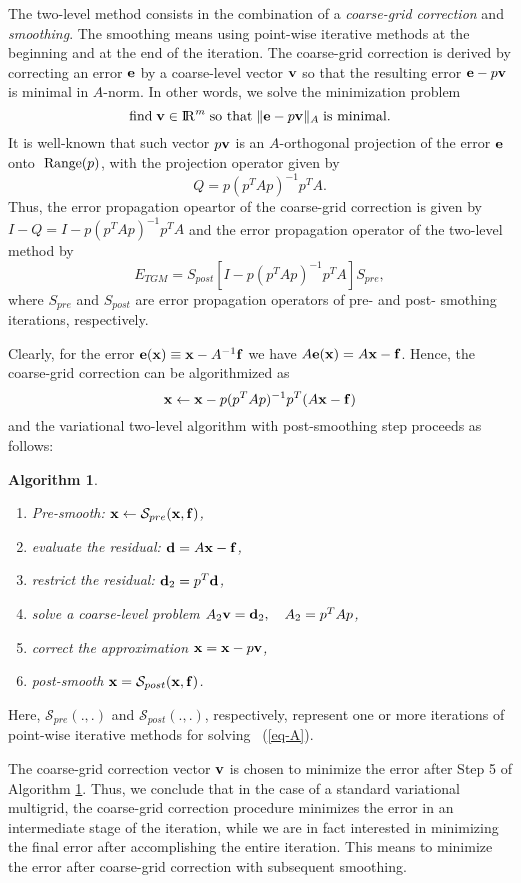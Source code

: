 \documentclass[twoside, 12pt]{article}
\renewcommand{\Re}{{\rm I\negthinspace R}}
\newcommand{\vc}[1]{{\bf #1}} 			%
\newcommand{\eq}[1]{\begin{equation}\label{eq-#1}}
\newcommand{\qe}{\end{equation}}
\newcommand{\range}{{\;\mathop {\rm Range}\nolimits}}
\newcommand{\eqr}[1]{~(\ref{eq-#1})}        %
\newtheorem{algorithm}{Algorithm}
\begin{document}
The two-level method consists in the combination of
a {\em coarse-grid correction} and
{\em smoothing}. The smoothing means using point-wise iterative methods 
at the beginning and at the end of the iteration.
The coarse-grid correction is derived by correcting an error
$\vc{e}$ by a coarse-level vector $\vc{v}$ so that the resulting error
$\vc{e}-p\vc{v}$ is minimal in $A$-norm. In other words, we solve
the minimization problem
\eq{standard}
  \mbox{find} \; \vc{v} \in \Re^m \; \mbox{so that} \;
  \| \vc{e}-p\vc{v}\|_A \; \mbox{is minimal}.
\qe
It is well-known that such vector $p\vc{v}$ is an $A$-orthogonal projection
of the error $\vc{e}$ onto $\range(p)$, with the projection
operator given by
$$
      Q = p(p^TAp)^{-1}p^TA.
$$
Thus, the error propagation opeartor of the coarse-grid correction is given by
$I-Q=I-p(p^TAp)^{-1}p^TA$ and the error propagation operator of the two-level
method by
\eq{E}
      E_{TGM}=S_{post}[I-p(p^TAp)^{-1}p^TA]S_{pre},
\qe
where $S_{pre}$ and $S_{post}$ are error propagation operators of
pre- and post- smothing iterations, respectively.

Clearly, for the error $\vc{e}(\vc{x})\equiv \vc{x}-A^{-1}\vc{f}$ we have
$A\vc{e}(\vc{x})=A\vc{x}-\vc{f}$. Hence, the coarse-grid correction can be
algorithmized  as
$$
     \vc{x} \leftarrow \vc{x} - p(p^TAp)^{-1}p^T(A\vc{x}-\vc{f})
$$
and the variational two-level algorithm with post-smoothing step
proceeds as follows:
\begin{algorithm}
\label{TL}
\quad
\begin{enumerate}
\item Pre-smooth: $\vc{x} \leftarrow {\mathcal S}_{pre}(\vc{x},\vc{f})$,
\item evaluate the residual:
   $\vc{d}=A\vc{x}-\vc{f}$,
\item restrict the residual:
   $\vc{d}_2 = p^T\vc{d}$,
\item solve a coarse-level problem
   $A_2 \vc{v} = \vc{d}_2,\quad A_2 = p^TAp$,
\item correct the approximation
   $\vc{x} = \vc{x} - p\vc{v}$,
\item post-smooth
   $\vc{x} = {\mathcal S}_{post}(\vc{x},\vc{f})$.
\end{enumerate}
\end{algorithm}
Here, ${\mathcal S}_{pre}(.,.)$ and ${\mathcal S}_{post}(.,.)$, respectively,
represent one or more iterations of
point-wise iterative methods for solving \eqr{A}.


The coarse-grid correction vector $\vc{v}$ is chosen to minimize the error
after Step 5 of Algorithm \ref{TL}.
Thus, we conclude that in the case of a standard variational multigrid,
the coarse-grid correction procedure minimizes
the error in an intermediate stage of the iteration,
while we are in fact interested in minimizing the final
error after accomplishing the entire iteration. This means to minimize
the error after coarse-grid correction with subsequent smoothing.
\end{document}
